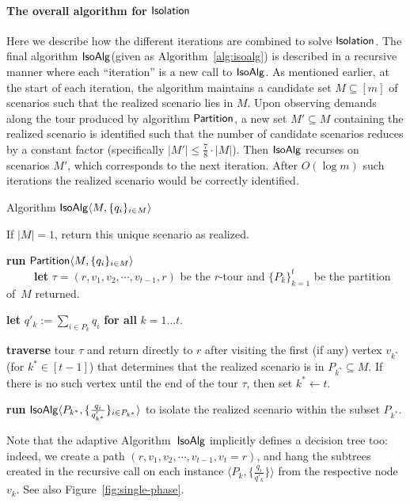 \documentclass[11pt]{article}
\def\sse{\subseteq}
\def\iso{\ensuremath{{\sf IsoAlg}}\xspace}
\def\palg{\ensuremath{{\sf Partition}}\xspace}
\def\isoprob{\ensuremath{{\sf Isolation}}\xspace}
\begin{document}
\paragraph{The overall algorithm for \isoprob} Here we describe how the different iterations are combined to solve \isoprob. 
The final algorithm \iso (given as Algorithm~\ref{alg:isoalg}) is described in a recursive manner where each ``iteration'' is a new call to \iso. As mentioned earlier, at the start of each iteration, the algorithm maintains a
candidate set $M\sse[m]$ of scenarios such that the realized scenario lies in $M$.  Upon observing demands along the tour
produced by algorithm \palg, 
 a new set $M'\sse M$ containing the realized scenario is 
identified such that the number of candidate scenarios reduces by a constant factor (specifically $|M'|\le \frac78 \cdot|M|$).
Then \iso recurses on scenarios $M'$, which corresponds to the next iteration.  After $O(\log m)$ such iterations the realized scenario would be correctly
identified.

\begin{algorithm}
  \caption{Algorithm $\iso\langle M,\{q_i\}_{i\in M} \rangle$}
  \label{alg:isoalg}
  \begin{algorithmic}[1]
    \STATE If $|M|=1$, return this unique scenario as realized.

    \STATE \label{step:iso2} \textbf{run} $\palg\langle M,\{q_i\}_{i\in M} \rangle$ \\
    ~~~~~\textbf{let} $\tau=(r,v_1,v_2,\cdots,v_{t-1},r)$ be the $r$-tour and
     $\{P_k\}_{k=1}^t$ be the partition of~$M$ returned.

    \STATE \textbf{let} $q'_k:=\sum_{i\in P_k} q_i$ \textbf{for all} $k=1\ldots t$.

    \STATE \label{step:iso3} \textbf{traverse} tour $\tau$ and return
    directly to $r$ after visiting the first (if any) vertex $v_{k^*}$
    (for $k^* \in [t-1]$) that determines that the realized scenario is
    in $P_{k^*} \sse M$. If there is no such vertex until the end of
    the tour $\tau$, then set $k^* \leftarrow t$.

    \STATE  \textbf{run} $\iso\langle P_{k^*},
    \{\frac{q_i}{q'_{k^*}}\}_{i\in P_{k^*}}\rangle$ to isolate the
    realized scenario within the subset $P_{k^*}$.
  \end{algorithmic}
\end{algorithm}

Note that the adaptive Algorithm~\iso implicitly defines a decision tree too: indeed, we create a path $(r, v_1, v_2,
\cdots, v_{t-1}, v_t = r)$, and hang the subtrees created in the recursive call on each instance $\langle P_k,
\{\frac{q_i}{q'_k}\} \rangle$ from the respective node $v_k$. See also Figure~\ref{fig:single-phase}.
\end{document}
